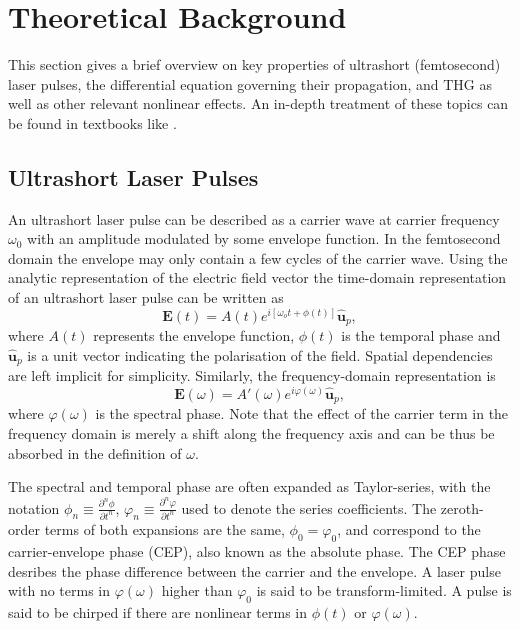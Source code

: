 \documentclass[a4paper]{jpconf}
\begin{document}
\section{Theoretical Background}
This section gives a brief overview on key properties of ultrashort (femtosecond) laser pulses, the differential equation governing their propagation, and THG as well as other relevant nonlinear effects. An in-depth treatment of these topics can be found in textbooks like \cite{keller2021, new2011}. 

\subsection{Ultrashort Laser Pulses}
An ultrashort laser pulse can be described as a carrier wave at carrier frequency $\omega_0$ with an amplitude modulated by some envelope function. In the femtosecond domain the envelope may only contain a few cycles of the carrier wave. Using the analytic representation of the electric field vector the time-domain representation of an ultrashort laser pulse can be written as 
\begin{equation}
\mathbf{E}(t) = A(t) e^{i[ \omega_o t + \phi(t)]} \hat{\mathbf{u}}_p,
\end{equation}
where $A(t)$ represents the envelope function, $\phi(t)$ is the temporal phase and $\hat{\mathbf{u}}_p$ is a unit vector indicating the polarisation of the field. Spatial dependencies are left implicit for simplicity. Similarly, the frequency-domain representation is 
\begin{equation}
\mathbf{E}(\omega) = A'(\omega) e^{i \varphi(\omega)} \hat{\mathbf{u}}_p,
\end{equation}
where $\varphi(\omega)$ is the spectral phase. Note that the effect of the carrier term in the frequency domain is merely a shift along the frequency axis and can be thus be absorbed in the definition of $\omega$. \par 
The spectral and temporal phase are often expanded as Taylor-series, with the notation $\phi_n \equiv \frac{\partial^n \phi}{\partial t^n}$, $\varphi_n \equiv \frac{\partial^n \varphi}{\partial t^n}$ used to denote the series coefficients. The zeroth-order terms of both expansions are the same, $\phi_0 = \varphi_0$, and correspond to the carrier-envelope phase (CEP), also known as the absolute phase. The CEP phase desribes the phase difference between the carrier and the envelope. A laser pulse with no terms in $\varphi(\omega)$ higher than $\varphi_0$ is said to be transform-limited. A pulse is said to be chirped if there are nonlinear terms in $\phi(t)$ or $\varphi(\omega)$. \par 
\end{document}
